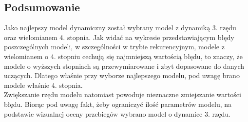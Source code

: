 \subsection{Podsumowanie}
Jako najlepszy model dynamiczny został wybrany model z dynamiką 3. rzędu oraz wielomianem 4. stopnia. Jak widać na wykresie przedstawiającym błędy poszczególnych modeli, w szczególności w trybie rekurencyjnym, modele z wielomianem o 4. stopniu cechują się najmniejszą wartością błędu, to znaczy, że modele o wyższych stopniach są przewymiarowane i zbyt dopasowane do danych uczących. Dlatego właśnie przy wyborze najlepszego modelu, pod uwagę brano modele właśnie 4. stopnia. \\
Zwiększanie rzędu modelu natomiast powoduje nieznaczne zmiejszanie wartości błędu. Biorąc pod uwagę fakt, żeby ograniczyć ilość parametrów modelu, na podstawie wizualnej oceny przebiegów wybrano model o dynamice 3. rzędu.
\newpage

